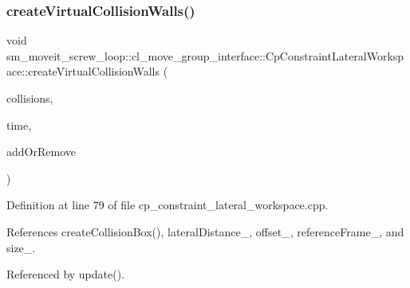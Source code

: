\subsubsection{\texorpdfstring{create\+Virtual\+Collision\+Walls()}{createVirtualCollisionWalls()}}
{\footnotesize\ttfamily void sm\+\_\+moveit\+\_\+screw\+\_\+loop\+::cl\+\_\+move\+\_\+group\+\_\+interface\+::\+Cp\+Constraint\+Lateral\+Workspace\+::create\+Virtual\+Collision\+Walls (\begin{DoxyParamCaption}\item[{std\+::vector$<$ moveit\+\_\+msgs\+::\+Collision\+Object $>$ \&}]{collisions,  }\item[{const ros\+::\+Time \&}]{time,  }\item[{int}]{add\+Or\+Remove }\end{DoxyParamCaption})}



Definition at line 79 of file cp\+\_\+constraint\+\_\+lateral\+\_\+workspace.\+cpp.



References create\+Collision\+Box(), lateral\+Distance\+\_\+, offset\+\_\+, reference\+Frame\+\_\+, and size\+\_\+.



Referenced by update().


